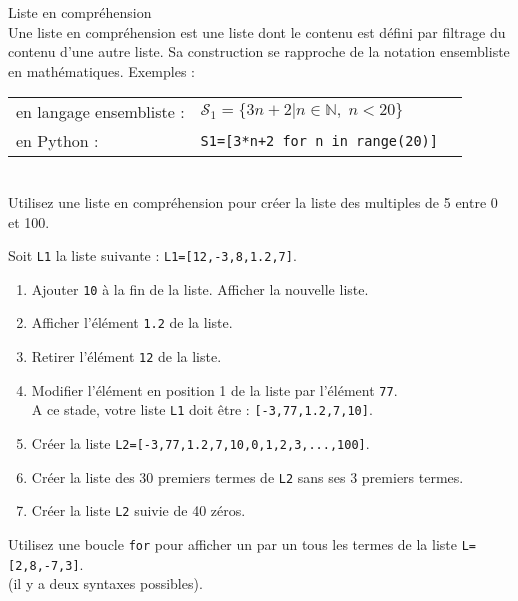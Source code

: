 \begin{defn}Liste en compréhension\\
Une liste en compréhension est une liste dont le contenu est défini par filtrage du contenu d'une autre liste. Sa construction se rapproche de la notation ensembliste en mathématiques.
\noindent Exemples : 
\begin{center}
\begin{tabular}{|l|l|l|}
\hline
en langage ensembliste :&$\mathcal{S}_1=\{3n+2|n\in\mathbb{N},\; n< 20\}$ \\[0.3cm]
en Python : &\verb?S1=[3*n+2 for n in range(20)]? \\
\hline
\end{tabular}
\end{center}
\end{defn}


\begin{exercice}~\\
Utilisez une liste en compréhension pour créer la liste des multiples de 5 entre 0 et 100.
\end{exercice}


\begin{exercice}
Soit \verb?L1? la liste suivante : \verb?L1=[12,-3,8,1.2,7]?.
\begin{enumerate}
\item Ajouter \verb?10? \` a la fin de la liste. Afficher la nouvelle liste.
\item Afficher l'élément \verb?1.2? de la liste.
\item Retirer l'élément \verb?12? de la liste. 
\item Modifier l'élément en position 1 de la liste par l'élément \verb?77?.\\
A ce stade, votre liste \verb?L1? doit être : \verb?[-3,77,1.2,7,10]?. 
\item Créer la liste \verb?L2=[-3,77,1.2,7,10,0,1,2,3,...,100]?.
\item Créer la liste des 30 premiers termes de \verb?L2? sans ses 3 premiers termes.
\item Créer la liste \verb?L2? suivie de 40 zéros.
\end{enumerate}
\end{exercice}

\begin{exercice}
Utilisez une boucle \verb?for? pour afficher un par un tous les termes de la liste \verb?L=[2,8,-7,3]?.\\
(il y a deux syntaxes possibles).
\end{exercice}

